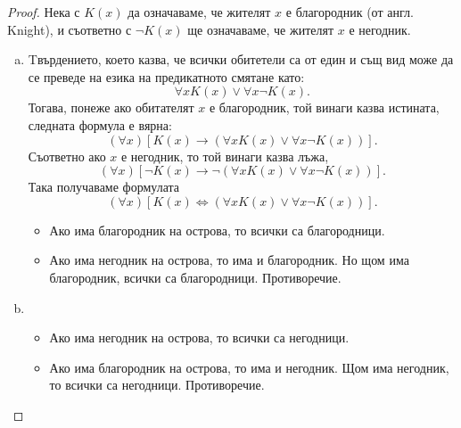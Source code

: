 \begin{proof}
  Нека с $K(x)$ да означаваме, че жителят $x$ е благородник (от англ. Knight),
  и съответно с $\neg K(x)$ ще означаваме, че жителят $x$ е негодник.
  \begin{enumerate}[a)]
  \item 
    Tвърдението, което казва, че всички обитетели са от един и същ вид може да се преведе 
    на езика на предикатното смятане като:
    \[\forall x K(x) \vee \forall x \neg K(x).\]
    Тогава, понеже ако обитателят $x$ е благородник, той винаги казва истината, 
    следната формула е вярна:
    \[(\forall x)[K(x) \rightarrow (\forall x K(x) \vee \forall x \neg K(x))].\]
    Съответно ако $x$ е негодник, то той винаги казва лъжа, 
    \[(\forall x)[\neg K(x) \rightarrow \neg (\forall x K(x) \vee \forall x \neg K(x))].\]
    Така получаваме формулата
    \[(\forall x)[K(x) \iff (\forall x K(x) \vee \forall x \neg K(x))].\]
    \begin{itemize}
    \item 
      Ако има благородник на острова, то всички са благородници.
    \item
      Ако има негодник на острова, то има и благородник.
      Но щом има благородник, всички са благородници. Противоречие.
    \end{itemize}
  \item
    \begin{itemize}
    \item
      Ако има негодник на острова, то всички са негодници.
    \item
      Ако има благородник на острова, то има и негодник.
      Щом има негодник, то  всички са негодници. Противоречие.
    \end{itemize}
  \end{enumerate}
\end{proof}

